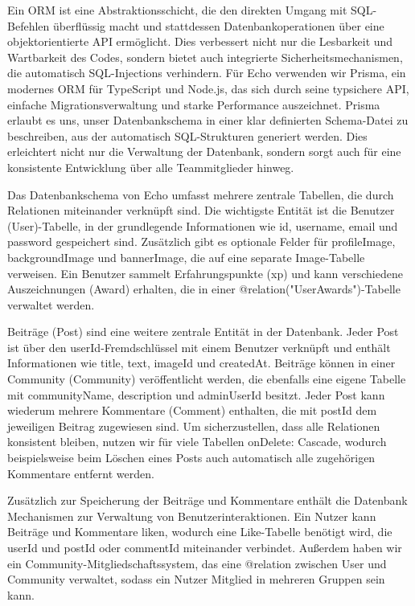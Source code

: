 \documentclass[a4paper,12pt]{article}
\begin{document}
Ein ORM ist eine Abstraktionsschicht, die den direkten Umgang mit SQL-Befehlen
überflüssig macht und stattdessen Datenbankoperationen über eine
objektorientierte API ermöglicht. Dies verbessert nicht nur die Lesbarkeit und
Wartbarkeit des Codes, sondern bietet auch integrierte Sicherheitsmechanismen,
die automatisch SQL-Injections verhindern. Für Echo verwenden wir Prisma, ein
modernes ORM für TypeScript und Node.js, das sich durch seine typsichere API,
einfache Migrationsverwaltung und starke Performance auszeichnet. Prisma
erlaubt es uns, unser Datenbankschema in einer klar definierten Schema-Datei zu
beschreiben, aus der automatisch SQL-Strukturen generiert werden. Dies
erleichtert nicht nur die Verwaltung der Datenbank, sondern sorgt auch für eine
konsistente Entwicklung über alle Teammitglieder hinweg.

Das Datenbankschema von Echo umfasst mehrere zentrale Tabellen, die durch
Relationen miteinander verknüpft sind. Die wichtigste Entität ist die Benutzer
(User)-Tabelle, in der grundlegende Informationen wie id, username, email und
password gespeichert sind. Zusätzlich gibt es optionale Felder für
profileImage, backgroundImage und bannerImage, die auf eine separate
Image-Tabelle verweisen. Ein Benutzer sammelt Erfahrungspunkte (xp) und kann
verschiedene Auszeichnungen (Award) erhalten, die in einer
@relation("UserAwards")-Tabelle verwaltet werden.

Beiträge (Post) sind eine weitere zentrale Entität in der Datenbank. Jeder Post
ist über den userId-Fremdschlüssel mit einem Benutzer verknüpft und enthält
Informationen wie title, text, imageId und createdAt. Beiträge können in einer
Community (Community) veröffentlicht werden, die ebenfalls eine eigene Tabelle
mit communityName, description und adminUserId besitzt. Jeder Post kann
wiederum mehrere Kommentare (Comment) enthalten, die mit postId dem jeweiligen
Beitrag zugewiesen sind. Um sicherzustellen, dass alle Relationen konsistent
bleiben, nutzen wir für viele Tabellen onDelete: Cascade, wodurch
beispielsweise beim Löschen eines Posts auch automatisch alle zugehörigen
Kommentare entfernt werden.

Zusätzlich zur Speicherung der Beiträge und Kommentare enthält die Datenbank
Mechanismen zur Verwaltung von Benutzerinteraktionen. Ein Nutzer kann Beiträge
und Kommentare liken, wodurch eine Like-Tabelle benötigt wird, die userId und
postId oder commentId miteinander verbindet. Außerdem haben wir ein
Community-Mitgliedschaftssystem, das eine @relation zwischen User und Community
verwaltet, sodass ein Nutzer Mitglied in mehreren Gruppen sein kann.
\end{document}
